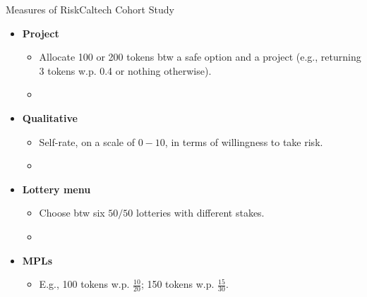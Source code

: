 \begin{frame}{Measures of Risk}{Caltech Cohort Study}\label{slide:cohort_risk}
    \begin{itemize}
        \item \textbf{Project}
        \begin{itemize}
            \item Allocate 100 or 200 tokens btw a safe option and a project (e.g., returning 3 tokens w.p. 0.4 or nothing otherwise).
            \item \cite{gneezy1997experiment}
        \end{itemize}
        \item \textbf{Qualitative}
        \begin{itemize}
            \item Self-rate, on a scale of $0-10$, in terms of willingness to take risk.
            \item \cite{dohmen2011individual}
        \end{itemize}
        \item \textbf{Lottery menu}
        \begin{itemize}
            \item Choose btw six $50/50$ lotteries with different stakes.
            \item \cite{eckel2002sex}
        \end{itemize}
        \item \textbf{MPLs}
        \begin{itemize}
            \item E.g., 100 tokens w.p. $\frac{10}{20}$; 150 tokens w.p. $\frac{15}{30}$.
        \end{itemize}
    \end{itemize}
    \hyperlink{app:cohort_over}{}\\
    \hyperlink{app:cohort_mpl}{}
\end{frame}

